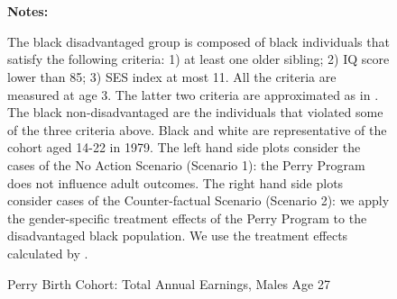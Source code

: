 \begin{figure} \begin{center}\centering
        \caption{Perry Birth Cohort: Total Annual Earnings, Males Age 27}
        \label{male_earn_decile1}\vspace{0.2cm}
        
          \\
          \\
\end{center}
{\scriptsize {\bfseries Notes: } \raggedright The black disadvantaged group is composed of black individuals that satisfy the following criteria: 1) at least one older sibling; 2) IQ score lower than 85; 3) SES index at most 11. All the criteria are measured at age 3. The latter two criteria are approximated as in \citet{heckman2010analyzing}. The black non-disadvantaged are the individuals that violated some of the three criteria above. Black and white are representative of the cohort aged 14-22 in 1979. The left hand side plots consider the cases of the No Action Scenario (Scenario 1): the Perry Program does not influence adult outcomes. The right hand side plots consider cases of the Counter-factual Scenario (Scenario 2): we apply the gender-specific treatment effects of the Perry Program to the disadvantaged black population. We use the treatment effects calculated by \citet{heckman2010analyzing}. 
}
\end{figure}



